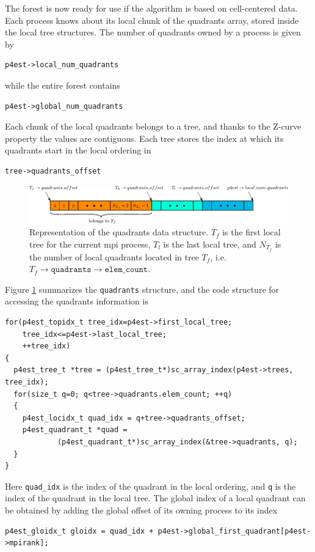\documentclass{article}
\newcommand{\ttt}[1]{\texttt{#1}}
\newcommand{\figb}{\begin{figure}[htbp]\begin{center}}
\newcommand{\fige}{\end{center}\end{figure}}
\begin{document}
The forest is now ready for use if the algorithm is based on cell-centered data. Each process knows about its local chunk of the quadrants array, stored inside the local tree structures. The number of quadrants owned by a process is given by
\begin{Verbatim}[frame=single]
p4est->local_num_quadrants
\end{Verbatim}
while the entire forest contains
\begin{Verbatim}[frame=single]
p4est->global_num_quadrants
\end{Verbatim}
Each chunk of the local quadrants belongs to a tree, and thanks to the Z-curve property the values are contiguous. Each tree stores the index at which its quadrants start in the local ordering in
\begin{Verbatim}[frame=single]
tree->quadrants_offset
\end{Verbatim}
\figb
\includegraphics[width=\textwidth]{figures/quadrants.pdf}
\caption{Representation of the quadrants data structure. $T_f$ is the first local tree for the current mpi process, $T_l$ is the last local tree, and $N_{T_f}$ is the number of local quadrants located in tree $T_f$, i.e.\ $T_f \rightarrow \texttt{quadrants} \rightarrow  \texttt{elem\_count}$.} \label{fig::quadrants}
\fige
Figure \ref{fig::quadrants} summarizes the \ttt{quadrants} structure, and the code structure for accessing the quadrants information is
\begin{Verbatim}[frame=single]
for(p4est_topidx_t tree_idx=p4est->first_local_tree;
	tree_idx<=p4est->last_local_tree;
	++tree_idx)
{
  p4est_tree_t *tree = (p4est_tree_t*)sc_array_index(p4est->trees, tree_idx);
  for(size_t q=0; q<tree->quadrants.elem_count; ++q)
  {
    p4est_locidx_t quad_idx = q+tree->quadrants_offset;
    p4est_quadrant_t *quad =
    		(p4est_quadrant_t*)sc_array_index(&tree->quadrants, q);
  }
}
\end{Verbatim}
Here \ttt{quad\_idx} is the index of the quadrant in the local ordering, and \ttt{q} is the index of the quadrant in the local tree. The global index of a local quadrant can be obtained by adding the global offset of its owning process to its index
\begin{Verbatim}[frame=single]
p4est_gloidx_t gloidx = quad_idx + p4est->global_first_quadrant[p4est->mpirank];
\end{Verbatim}
\end{document}
